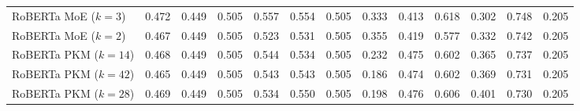 \begin{tabular}{lcccccccccccc}
RoBERTa MoE ($k=3$) & 0.472 & 0.449 & 0.505 & 0.557 & 0.554 & 0.505 & 0.333 & 0.413 & 0.618 & 0.302 & 0.748 & 0.205 \\
RoBERTa MoE ($k=2$) & 0.467 & 0.449 & 0.505 & 0.523 & 0.531 & 0.505 & 0.355 & 0.419 & 0.577 & 0.332 & 0.742 & 0.205 \\
RoBERTa PKM ($k=14$) & 0.468 & 0.449 & 0.505 & 0.544 & 0.534 & 0.505 & 0.232 & 0.475 & 0.602 & 0.365 & 0.737 & 0.205 \\
RoBERTa PKM ($k=42$) & 0.465 & 0.449 & 0.505 & 0.543 & 0.543 & 0.505 & 0.186 & 0.474 & 0.602 & 0.369 & 0.731 & 0.205 \\
RoBERTa PKM ($k=28$) & 0.469 & 0.449 & 0.505 & 0.534 & 0.550 & 0.505 & 0.198 & 0.476 & 0.606 & 0.401 & 0.730 & 0.205 \\
\bottomrule
\end{tabular}